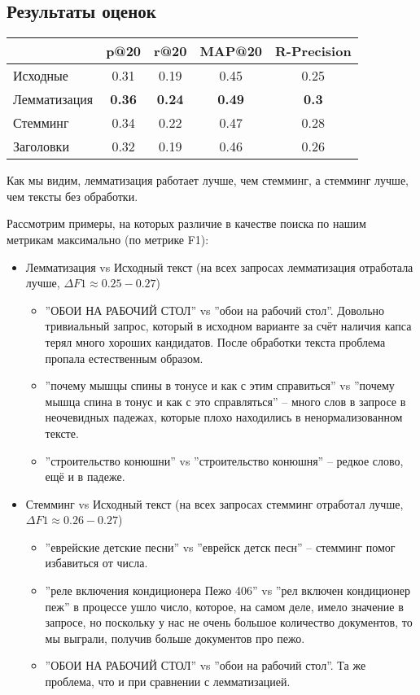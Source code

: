 \subsection{Результаты оценок}

\begin{center}
	\begin{tabular}{l|cccc}
		& p@20 & r@20 & MAP@20 & R-Precision\\
		\hline
		Исходные & 0.31 & 0.19 & 0.45 & 0.25\\
		Лемматизация & {\bf 0.36} & {\bf 0.24} & {\bf 0.49} & {\bf 0.3}\\
		Стемминг & 0.34 & 0.22 & 0.47 & 0.28 \\
		Заголовки & 0.32 & 0.19 & 0.46 & 0.26\\
	\end{tabular}
\end{center}

Как мы видим, лемматизация работает лучше, чем стемминг, а стемминг лучше, чем тексты без обработки. 

Рассмотрим примеры, на которых различие в качестве поиска по нашим метрикам максимально (по метрике F1):

\begin{itemize}
	\item Лемматизация vs Исходный текст (на всех запросах лемматизация отработала лучше, $\Delta F1 \approx 0.25-0.27$)\begin{itemize}
		\item ''ОБОИ НА РАБОЧИЙ СТОЛ'' vs ''обои на рабочий стол''. Довольно тривиальный запрос, который в исходном варианте за счёт наличия капса терял много хороших кандидатов. После обработки текста проблема пропала естественным образом.
		\item ''почему мышцы спины в тонусе и как с этим справиться'' vs ''почему мышца спина в тонус и как с это справляться'' -- много слов в запросе в неочевидных падежах, которые плохо находились в ненормализованном тексте. 
		\item ''строительство конюшни'' vs ''строительство конюшня'' -- редкое слово, ещё и в падеже.
	\end{itemize}
	\item Стемминг vs Исходный текст (на всех запросах стемминг отработал лучше, $\Delta F1 \approx 0.26-0.27$) \begin{itemize}
		\item ''еврейские детские песни'' vs ''еврейск детск песн'' -- стемминг помог избавиться от числа.
		\item ''реле включения кондиционера Пежо 406'' vs ''рел включен кондиционер пеж'' в процессе ушло число, которое, на самом деле, имело значение в запросе, но поскольку у нас не очень большое количество документов, то мы выграли, получив больше документов про пежо.
		\item ''ОБОИ НА РАБОЧИЙ СТОЛ'' vs ''обои на рабочий стол''. Та же проблема, что и при сравнении с лемматизацией.
	\end{itemize}
\end{itemize}